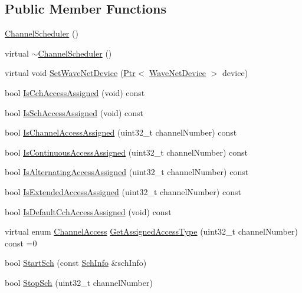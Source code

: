 \subsection*{Public Member Functions}
\begin{DoxyCompactItemize}
\item 
\hyperlink{classns3_1_1ChannelScheduler_a2f96786a2f02ae75850ab8d25e59facd}{Channel\+Scheduler} ()
\item 
virtual \hyperlink{classns3_1_1ChannelScheduler_ad580d0aefd2b78a9bfb62b6160d36327}{$\sim$\+Channel\+Scheduler} ()
\item 
virtual void \hyperlink{classns3_1_1ChannelScheduler_ab4eb73cab44db60e732ca698eb075620}{Set\+Wave\+Net\+Device} (\hyperlink{classns3_1_1Ptr}{Ptr}$<$ \hyperlink{classns3_1_1WaveNetDevice}{Wave\+Net\+Device} $>$ device)
\item 
bool \hyperlink{classns3_1_1ChannelScheduler_a2523f1c208f050878665d935cd6c97ac}{Is\+Cch\+Access\+Assigned} (void) const 
\item 
bool \hyperlink{classns3_1_1ChannelScheduler_a935251d2e5029fd3dc0ed04e0ceaa39a}{Is\+Sch\+Access\+Assigned} (void) const 
\item 
bool \hyperlink{classns3_1_1ChannelScheduler_a6cb7d46ab8c0fb6790abd1a765d82fa8}{Is\+Channel\+Access\+Assigned} (uint32\+\_\+t channel\+Number) const 
\item 
bool \hyperlink{classns3_1_1ChannelScheduler_acef661fd5ec7c34ebd5854b5a2d4ec7d}{Is\+Continuous\+Access\+Assigned} (uint32\+\_\+t channel\+Number) const 
\item 
bool \hyperlink{classns3_1_1ChannelScheduler_a219911235725fadaefd5439780aff122}{Is\+Alternating\+Access\+Assigned} (uint32\+\_\+t channel\+Number) const 
\item 
bool \hyperlink{classns3_1_1ChannelScheduler_afdd2a9578d33658a090a6ac1f509d71d}{Is\+Extended\+Access\+Assigned} (uint32\+\_\+t channel\+Number) const 
\item 
bool \hyperlink{classns3_1_1ChannelScheduler_ae76b2a23ba50d8ac700b507bfb7d62bd}{Is\+Default\+Cch\+Access\+Assigned} (void) const 
\item 
virtual enum \hyperlink{namespacens3_a877f2f8d3767cc34993bce0739179781}{Channel\+Access} \hyperlink{classns3_1_1ChannelScheduler_a422ee6bde4c904f644facb94783e7e32}{Get\+Assigned\+Access\+Type} (uint32\+\_\+t channel\+Number) const =0
\item 
bool \hyperlink{classns3_1_1ChannelScheduler_a341186be2ac96608e986c77e56ffc2d1}{Start\+Sch} (const \hyperlink{structns3_1_1SchInfo}{Sch\+Info} \&sch\+Info)
\item 
bool \hyperlink{classns3_1_1ChannelScheduler_a1ed1aab5fee4893c7f9efb8210048b67}{Stop\+Sch} (uint32\+\_\+t channel\+Number)
\end{DoxyCompactItemize}
